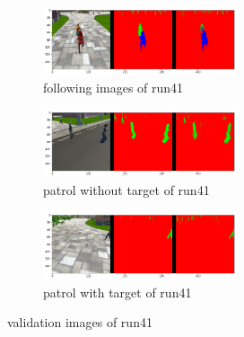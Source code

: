 \documentclass[paper=a4, fontsize=11pt]{scrartcl} %
\numberwithin{equation}{section} %
\numberwithin{figure}{section} %
\numberwithin{table}{section} %
\begin{document}
\begin{figure}[ht]
	\begin{subfigure}{0.33\textwidth}
	\includegraphics[width=0.9\linewidth, height=2cm]{./imgs/following_images4_1.png} 
	\caption{following images of run41}
	\label{fig:subfollowing_images41}
	\end{subfigure}
	\begin{subfigure}{0.33\textwidth}
	\includegraphics[width=0.9\linewidth, height=2cm]{./imgs/patrol_non_targ4_1.png}
	\caption{patrol without target of run41}
	\label{fig:subpatrol_non_targ41}
	\end{subfigure}
	\begin{subfigure}{0.33\textwidth}
	\includegraphics[width=0.9\linewidth, height=2cm]{./imgs/patrol_with_targ4_1.png}
	\caption{patrol with target of run41}
	\label{fig:subpatrol_with_targ41}
	\end{subfigure}

	\caption{validation images of run41}
	\label{fig:outputimages41}
\end{figure}
\end{document}
